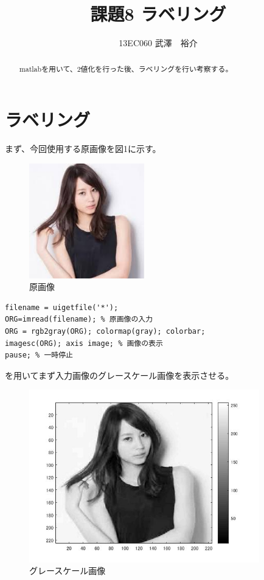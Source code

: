 \documentclass{jsarticle}
\begin{document}
\title{課題8 ラベリング}
\author{13EC060 武澤　裕介}
\maketitle
\begin{abstract}
matlabを用いて、2値化を行った後、ラベリングを行い考察する。
\end{abstract}
\section{ラベリング}
まず、今回使用する原画像を図1に示す。


\begin{figure}[htbp]
 \begin{center}
  \includegraphics[width=5cm,height=5cm]{index.jpg}
 \end{center}
 \caption{原画像}
\end{figure}

\begin{lstlisting}[basicstyle=\ttfamily\footnotesize, frame=single]
filename = uigetfile('*');
ORG=imread(filename); % 原画像の入力
ORG = rgb2gray(ORG); colormap(gray); colorbar;
imagesc(ORG); axis image; % 画像の表示
pause; % 一時停止
 \end{lstlisting}
を用いてまず入力画像のグレースケール画像を表示させる。

\newpage
\begin{figure}[htbp]
 \begin{center}
  \includegraphics[width=10cm]{8-0.jpg}
 \end{center}
 \caption{グレースケール画像}
\end{figure}
\end{document}

